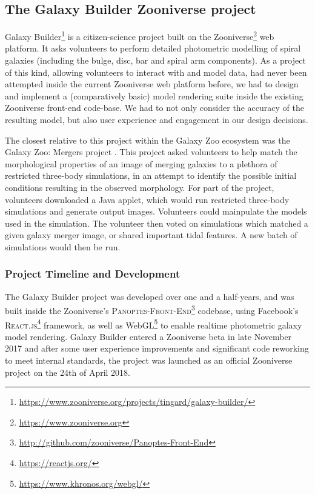 \documentclass[../main.tex]{subfiles}
\begin{document}
\label{sec:method}

\subsection{The Galaxy Builder Zooniverse project}

Galaxy Builder\footnote{\url{https://www.zooniverse.org/projects/tingard/galaxy-builder/}} is a citizen-science project built on the Zooniverse\footnote{\url{https://www.zooniverse.org}} web platform. It asks volunteers to perform detailed photometric modelling of spiral galaxies (including the bulge, disc, bar and spiral arm components). As a project of this kind, allowing volunteers to interact with and model data, had never been attempted inside the current Zooniverse web platform before, we had to design and implement a (comparatively basic) model rendering suite inside the existing Zooniverse front-end code-base. We had to not only consider the accuracy of the resulting model, but also user experience and engagement in our design decisions.

The closest relative to this project within the Galaxy Zoo ecosystem was the Galaxy Zoo: Mergers project \citep{Holincheck2016:1604.00435v1}. This project asked volunteers to help match the morphological properties of an image of merging galaxies to a plethora of restricted three-body simulations, in an attempt to identify the possible initial conditions resulting in the observed morphology. For part of the project, volunteers downloaded a Java applet, which would run restricted three-body simulations and generate output images. Volunteers could mainpulate the models used in the simulation. The volunteer then voted on simulations which matched a given galaxy merger image, or shared important tidal features. A new batch of simulations would then be run.

\subsubsection{Project Timeline and Development}

The Galaxy Builder project was developed over one and a half-years, and was built inside the Zooniverse's \textsc{Panoptes-Front-End}\footnote{\url{http://github.com/zooniverse/Panoptes-Front-End}} codebase, using Facebook's \textsc{React.js}\footnote{\url{https://reactjs.org/}} framework, as well as WebGL\footnote{\url{https://www.khronos.org/webgl/}} to enable realtime photometric galaxy model rendering. Galaxy Builder entered a Zooniverse beta in late November 2017 and after some user experience improvements and significant code reworking to meet internal standards, the project was launched as an official Zooniverse project on the 24th of April 2018.
\end{document}
